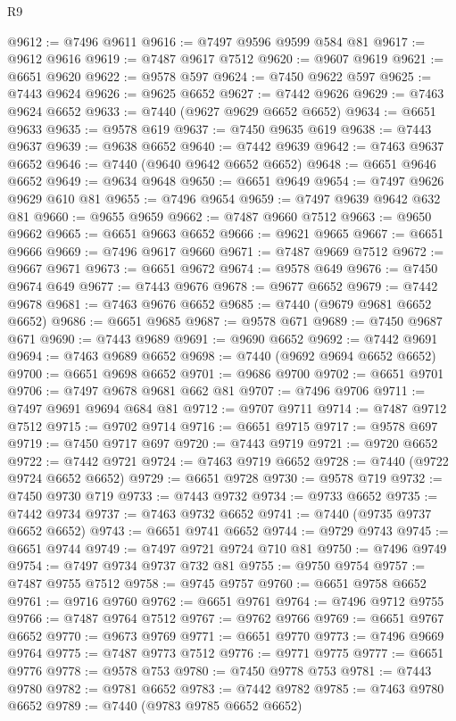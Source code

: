 \begin{lexlean}{R9}
\begin{coremodule}
@9612 := @7496 @9611
@9616 := @7497 @9596 @9599 @584 @81
@9617 := @9612 @9616
@9619 := @7487 @9617 @7512
@9620 := @9607 @9619
@9621 := @6651 @9620
@9622 := @9578 @597
@9624 := @7450 @9622 @597
@9625 := @7443 @9624
@9626 := @9625 @6652
@9627 := @7442 @9626
@9629 := @7463 @9624 @6652
@9633 := @7440 (@9627 @9629 @6652 @6652)
@9634 := @6651 @9633
@9635 := @9578 @619
@9637 := @7450 @9635 @619
@9638 := @7443 @9637
@9639 := @9638 @6652
@9640 := @7442 @9639
@9642 := @7463 @9637 @6652
@9646 := @7440 (@9640 @9642 @6652 @6652)
@9648 := @6651 @9646 @6652
@9649 := @9634 @9648
@9650 := @6651 @9649
@9654 := @7497 @9626 @9629 @610 @81
@9655 := @7496 @9654
@9659 := @7497 @9639 @9642 @632 @81
@9660 := @9655 @9659
@9662 := @7487 @9660 @7512
@9663 := @9650 @9662
@9665 := @6651 @9663 @6652
@9666 := @9621 @9665
@9667 := @6651 @9666
@9669 := @7496 @9617 @9660
@9671 := @7487 @9669 @7512
@9672 := @9667 @9671
@9673 := @6651 @9672
@9674 := @9578 @649
@9676 := @7450 @9674 @649
@9677 := @7443 @9676
@9678 := @9677 @6652
@9679 := @7442 @9678
@9681 := @7463 @9676 @6652
@9685 := @7440 (@9679 @9681 @6652 @6652)
@9686 := @6651 @9685
@9687 := @9578 @671
@9689 := @7450 @9687 @671
@9690 := @7443 @9689
@9691 := @9690 @6652
@9692 := @7442 @9691
@9694 := @7463 @9689 @6652
@9698 := @7440 (@9692 @9694 @6652 @6652)
@9700 := @6651 @9698 @6652
@9701 := @9686 @9700
@9702 := @6651 @9701
@9706 := @7497 @9678 @9681 @662 @81
@9707 := @7496 @9706
@9711 := @7497 @9691 @9694 @684 @81
@9712 := @9707 @9711
@9714 := @7487 @9712 @7512
@9715 := @9702 @9714
@9716 := @6651 @9715
@9717 := @9578 @697
@9719 := @7450 @9717 @697
@9720 := @7443 @9719
@9721 := @9720 @6652
@9722 := @7442 @9721
@9724 := @7463 @9719 @6652
@9728 := @7440 (@9722 @9724 @6652 @6652)
@9729 := @6651 @9728
@9730 := @9578 @719
@9732 := @7450 @9730 @719
@9733 := @7443 @9732
@9734 := @9733 @6652
@9735 := @7442 @9734
@9737 := @7463 @9732 @6652
@9741 := @7440 (@9735 @9737 @6652 @6652)
@9743 := @6651 @9741 @6652
@9744 := @9729 @9743
@9745 := @6651 @9744
@9749 := @7497 @9721 @9724 @710 @81
@9750 := @7496 @9749
@9754 := @7497 @9734 @9737 @732 @81
@9755 := @9750 @9754
@9757 := @7487 @9755 @7512
@9758 := @9745 @9757
@9760 := @6651 @9758 @6652
@9761 := @9716 @9760
@9762 := @6651 @9761
@9764 := @7496 @9712 @9755
@9766 := @7487 @9764 @7512
@9767 := @9762 @9766
@9769 := @6651 @9767 @6652
@9770 := @9673 @9769
@9771 := @6651 @9770
@9773 := @7496 @9669 @9764
@9775 := @7487 @9773 @7512
@9776 := @9771 @9775
@9777 := @6651 @9776
@9778 := @9578 @753
@9780 := @7450 @9778 @753
@9781 := @7443 @9780
@9782 := @9781 @6652
@9783 := @7442 @9782
@9785 := @7463 @9780 @6652
@9789 := @7440 (@9783 @9785 @6652 @6652)

\end{coremodule}
\end{lexlean}
